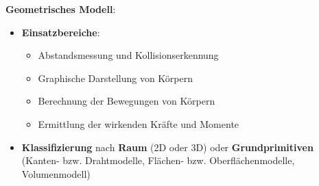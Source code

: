 \bigskip
\textbf{Geometrisches Modell}:
\begin{itemize}
	\item \textbf{Einsatzbereiche}: 
	\begin{itemize}
		\item Abstandsmessung und Kollisionserkennung
		\item Graphische Darstellung von Körpern
		\item Berechnung der Bewegungen von Körpern
		\item Ermittlung der wirkenden Kräfte und Momente
	\end{itemize}
	\item \textbf{Klassifizierung} nach \textbf{Raum} (2D oder 3D) oder \textbf{Grundprimitiven} (Kanten- bzw. Drahtmodelle, Flächen- bzw. Oberflächenmodelle, Volumenmodell)
\end{itemize}

